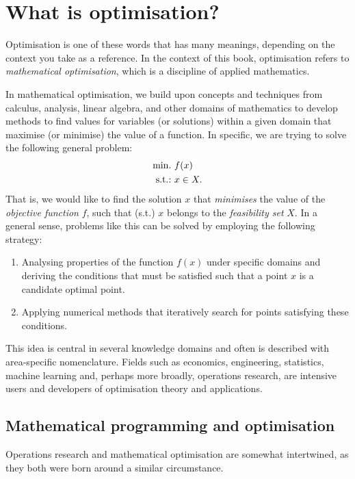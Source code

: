 \section{What is optimisation?}

Optimisation is one of these words that has many meanings, depending on the context you take as a reference. In the context of this book, optimisation refers to \emph{mathematical optimisation}, which is a discipline of applied mathematics.

In mathematical optimisation, we build upon concepts and techniques from calculus, analysis, linear algebra, and other domains of mathematics to develop methods to find values for variables (or solutions) within a given domain that maximise (or minimise) the value of a function. In specific, we are trying to solve the following general problem:
%
\begin{align}
    \mathop{\text{min.~}} & f(x) \label{p1c1:eq:opt_prob} \\
    \mathop{\text{s.t.:~}}   & x \in X. \nonumber
\end{align}
%
That is, we would like to find the solution $x$ that \emph{minimises} the value of the \emph{objective function} $f$, such that (s.t.) $x$ belongs to the \emph{feasibility set} $X$. In a general sense, problems like this can be solved by employing the following strategy:
%
\begin{enumerate}
    \item Analysing properties of the function $f(x)$ under specific domains and deriving the conditions that must be satisfied such that a point $x$ is a candidate optimal point.
    \item Applying numerical methods that iteratively search for points satisfying these conditions. 
\end{enumerate}
%
This idea is central in several knowledge domains and often is described with area-specific nomenclature. Fields such as economics, engineering, statistics, machine learning and, perhaps more broadly, operations research, are intensive users and developers of optimisation theory and applications. 

\subsection{Mathematical programming and optimisation}

Operations research and mathematical optimisation are somewhat intertwined, as they both were born around a similar circumstance. %

